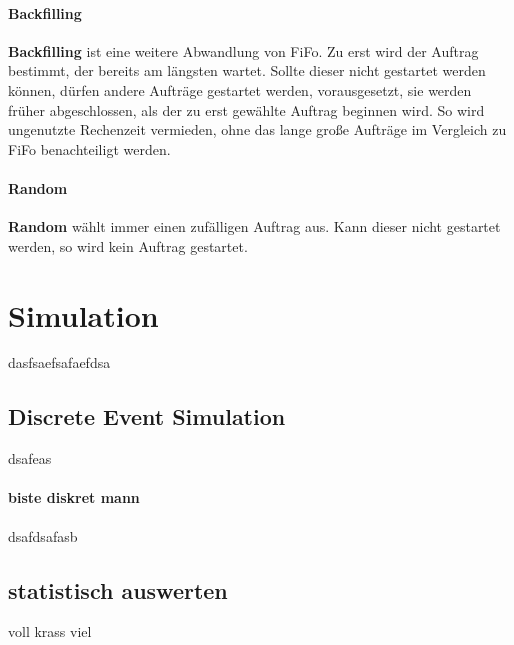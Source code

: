 \paragraph{Backfilling}
\textbf{Backfilling} ist eine weitere Abwandlung von FiFo. Zu erst wird der Auftrag bestimmt, der bereits am längsten wartet. Sollte dieser nicht gestartet werden können, dürfen andere Aufträge gestartet werden, vorausgesetzt, sie werden früher abgeschlossen, als der zu erst gewählte Auftrag beginnen wird. So wird ungenutzte Rechenzeit vermieden, ohne das lange große Aufträge im Vergleich zu FiFo benachteiligt werden.

\paragraph{Random}
\textbf{Random} wählt immer einen zufälligen Auftrag aus. Kann dieser nicht gestartet werden, so wird kein Auftrag gestartet.

\section{Simulation}

dasfsaefsafaefdsa

\subsection{Discrete Event Simulation}

dsafeas

\paragraph{biste diskret mann}
dsafdsafasb

\subsection{statistisch auswerten}

voll krass viel
